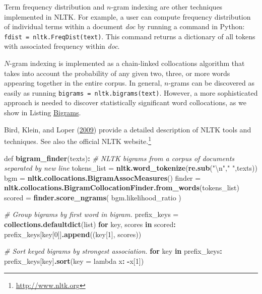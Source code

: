 \documentclass[]{krantz}
\newenvironment{Shaded}{\begin{snugshade}}{\end{snugshade}}
\newcommand{\KeywordTok}[1]{\textcolor[rgb]{0.13,0.29,0.53}{\textbf{#1}}}
\newcommand{\DataTypeTok}[1]{\textcolor[rgb]{0.13,0.29,0.53}{#1}}
\newcommand{\DecValTok}[1]{\textcolor[rgb]{0.00,0.00,0.81}{#1}}
\newcommand{\CharTok}[1]{\textcolor[rgb]{0.31,0.60,0.02}{#1}}
\newcommand{\StringTok}[1]{\textcolor[rgb]{0.31,0.60,0.02}{#1}}
\newcommand{\CommentTok}[1]{\textcolor[rgb]{0.56,0.35,0.01}{\textit{#1}}}
\newcommand{\ControlFlowTok}[1]{\textcolor[rgb]{0.13,0.29,0.53}{\textbf{#1}}}
\newcommand{\OperatorTok}[1]{\textcolor[rgb]{0.81,0.36,0.00}{\textbf{#1}}}
\newcommand{\NormalTok}[1]{#1}
\begin{document}
Term frequency distribution and \(n\)-gram indexing are other techniques
implemented in NLTK. For example, a user can compute frequency
distribution of individual terms within a document \emph{doc} by running
a command in Python: \texttt{fdist\ =\ nltk.FreqDist(text)}. This
command returns a dictionary of all tokens with associated frequency
within \emph{doc}.

\(N\)-gram indexing is implemented as a chain-linked collocations
algorithm that takes into account the probability of any given two,
three, or more words appearing together in the entire corpus. In
general, \(n\)-grams can be discovered as easily as running
\texttt{bigrams\ =\ nltk.bigrams(text)}. However, a more sophisticated
approach is needed to discover statistically significant word
collocations, as we show in Listing
\protect\hyperlink{list:text1}{Bigrams}.

Bird, Klein, and Loper (\protect\hyperlink{ref-bird-09}{2009}) provide a
detailed description of NLTK tools and techniques. See also the official
NLTK website.\footnote{\url{http://www.nltk.org}}

\begin{Shaded}
\begin{Highlighting}[]
\NormalTok{def }\KeywordTok{bigram_finder}\NormalTok{(texts)}\OperatorTok{:}
\StringTok{  }\CommentTok{# NLTK bigrams from a corpus of documents separated by new line}
\StringTok{  }\NormalTok{tokens_list =}\StringTok{ }\KeywordTok{nltk.word_tokenize}\NormalTok{(}\KeywordTok{re.sub}\NormalTok{(}\StringTok{"}\CharTok{\textbackslash{}n}\StringTok{"}\NormalTok{,}\StringTok{" "}\NormalTok{,texts))}
\NormalTok{  bgm    =}\StringTok{ }\KeywordTok{nltk.collocations.BigramAssocMeasures}\NormalTok{()}
\NormalTok{  finder =}\StringTok{ }\KeywordTok{nltk.collocations.BigramCollocationFinder.from_words}\NormalTok{(tokens_list)}
\NormalTok{  scored =}\StringTok{ }\KeywordTok{finder.score_ngrams}\NormalTok{( bgm.likelihood_ratio  )}

  \CommentTok{# Group bigrams by first word in bigram.}
\NormalTok{  prefix_keys =}\StringTok{ }\KeywordTok{collections.defaultdict}\NormalTok{(list)}
  \ControlFlowTok{for}\NormalTok{ key, scores }\ControlFlowTok{in}\NormalTok{ scored}\OperatorTok{:}
\StringTok{      }\NormalTok{prefix_keys[key[}\DecValTok{0}\NormalTok{]]}\KeywordTok{.append}\NormalTok{((key[}\DecValTok{1}\NormalTok{], scores))}

  \CommentTok{# Sort keyed bigrams by strongest association.}
  \ControlFlowTok{for}\NormalTok{ key }\ControlFlowTok{in}\NormalTok{ prefix_keys}\OperatorTok{:}
\StringTok{      }\NormalTok{prefix_keys[key]}\KeywordTok{.sort}\NormalTok{(}\DataTypeTok{key =}\NormalTok{ lambda x}\OperatorTok{:}\StringTok{ }\OperatorTok{-}\NormalTok{x[}\DecValTok{1}\NormalTok{])}
\end{Highlighting}
\end{Shaded}
\end{document}
